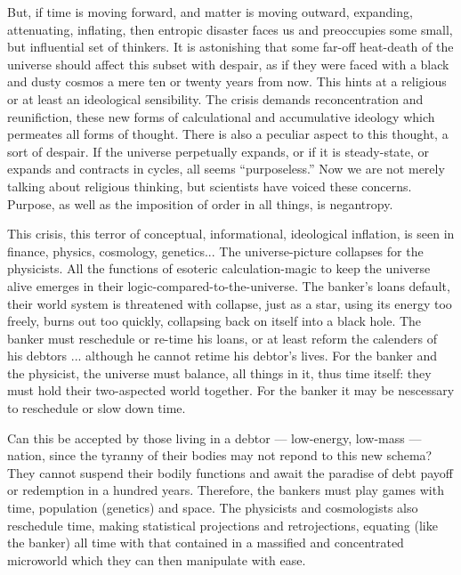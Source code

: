 But, if time is moving forward, and matter is moving outward, expanding, attenuating, inflating, then entropic disaster faces us and preoccupies some small, but influential set of thinkers. It is astonishing that some far-off heat-death of the universe should affect this subset with despair, as if they were faced with a black and dusty cosmos a mere ten or twenty years from now. This hints at a religious or at least an ideological sensibility. The crisis demands reconcentration and reunifiction, these new forms of calculational and accumulative ideology which permeates all forms of thought. There is also a peculiar aspect to this thought, a sort of despair. If the universe perpetually expands, or if it is steady-state, or expands and contracts in cycles, all seems \enquote{purposeless.} Now we are not merely talking about religious thinking, but scientists have voiced these concerns. Purpose, as well as the imposition of order in all things, is negantropy.

This crisis, this terror of conceptual, informational, ideological inflation, is seen in finance, physics, cosmology, genetics... The universe-picture collapses for the physicists. All the functions of esoteric calculation-magic to keep the universe alive emerges in their logic-compared-to-the-universe. The banker's loans default, their world system is threatened with collapse, just as a star, using its energy too freely, burns out too quickly, collapsing back on itself into a black hole. The banker must reschedule or re-time his loans, or at least reform the calenders of his debtors ... although he cannot retime his debtor's lives. For the banker and the physicist, the universe must balance, all things in it, thus time itself: they must hold their two-aspected world together. For the banker it may be nescessary to reschedule or slow down time.

Can this be accepted by those living in a debtor --- low-energy, low-mass --- nation, since the tyranny of their bodies may not repond to this new schema? They cannot suspend their bodily functions and await the paradise of debt payoff or redemption in a hundred years. Therefore, the bankers must play games with time, population (genetics) and space. The physicists and cosmologists also reschedule time, making statistical projections and retrojections, equating (like the banker) all time with that contained in a massified and concentrated microworld which they can then manipulate with ease.

